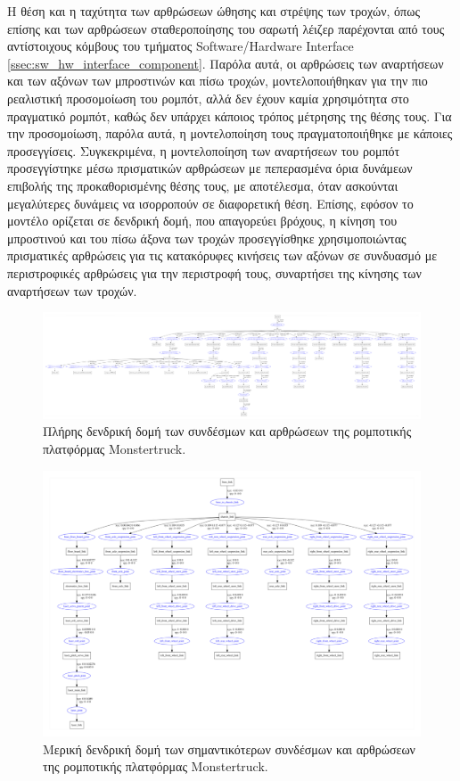 \bigskip
Η θέση και η ταχύτητα  των αρθρώσεων ώθησης και στρέψης των τροχών, όπως επίσης και των αρθρώσεων σταθεροποίησης του σαρωτή λέιζερ παρέχονται από τους αντίστοιχους κόμβους του τμήματος Software/Hardware Interface \ref{ssec:sw_hw_interface_component}. Παρόλα αυτά, οι αρθρώσεις των αναρτήσεων και των αξόνων των μπροστινών και πίσω τροχών, μοντελοποιήθηκαν για την πιο ρεαλιστική προσομοίωση του ρομπότ, αλλά δεν έχουν καμία χρησιμότητα στο πραγματικό ρομπότ, καθώς δεν υπάρχει κάποιος τρόπος μέτρησης της θέσης τους. Για την προσομοίωση, παρόλα αυτά, η μοντελοποίηση τους πραγματοποιήθηκε με κάποιες προσεγγίσεις. Συγκεκριμένα, η μοντελοποίηση των αναρτήσεων του ρομπότ προσεγγίστηκε μέσω πρισματικών αρθρώσεων με πεπερασμένα όρια δυνάμεων επιβολής της προκαθορισμένης θέσης τους, με αποτέλεσμα, όταν ασκούνται μεγαλύτερες δυνάμεις να ισορροπούν σε διαφορετική θέση. Επίσης, εφόσον το μοντέλο ορίζεται σε δενδρική δομή, που απαγορεύει βρόχους, η κίνηση του μπροστινού και του πίσω άξονα των τροχών προσεγγίσθηκε χρησιμοποιώντας πρισματικές αρθρώσεις για τις κατακόρυφες κινήσεις των αξόνων σε συνδυασμό με περιστροφικές αρθρώσεις για την περιστροφή τους, συναρτήσει της κίνησης των αναρτήσεων των τροχών. 


\begin{figure}[!ht]
	\centering
	\includegraphics[width=\linewidth]{Chapters/Chapter4/Figures/monstertruck_urdf_tree.png}
	\caption{Πλήρης δενδρική δομή των συνδέσμων και αρθρώσεων της ρομποτικής πλατφόρμας Monstertruck.}
	\label{fig:full_model}
\end{figure}

\begin{figure}[!ht]
	\centering
	\includegraphics[width=\linewidth]{Chapters/Chapter4/Figures/monstertruck_simplified_urdf_tree.png}
	\caption{Μερική δενδρική δομή των σημαντικότερων συνδέσμων και αρθρώσεων της ρομποτικής πλατφόρμας Monstertruck.}
	\label{fig:simple_model}
\end{figure}


